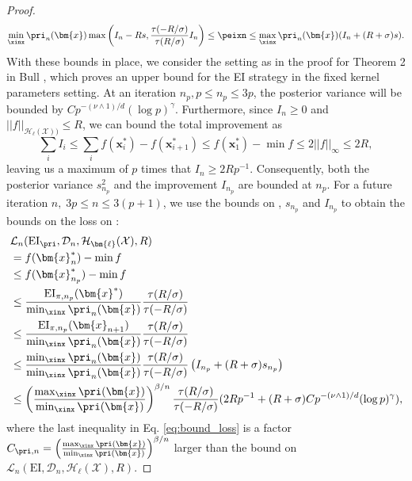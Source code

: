 \begin{proof}
\begin{equation}
    {\min_{\xinx}\pri_n(\bm{x})}\max\left(I_n-Rs, \frac{\tau(-R/\sigma)}{\tau(R/\sigma)}I_n\right) \leq \peixn \leq {\max_{\xinx}\pri_n(\bm{x})} (I_n + (R + \sigma)s). 
\end{equation}
With these bounds in place, we consider the setting as in the proof for Theorem 2 in Bull \cite{JMLR:v12:bull11a}, which proves an upper bound for the EI strategy in the fixed kernel parameters setting. 
At an iteration $n_p, p \leq n_p \leq 3p$, the posterior variance will be bounded by $Cp^{-(\nu \land 1)/d}(\log p)^\gamma$. Furthermore, since $I_n \geq 0$ and $||f||_{\mathcal{H}_\ell(\mathcal{X}))} \leq R$, we can bound the total improvement as
\begin{equation}
    \sum_i I_i \leq \sum_i f(\bm{x}^*_{i}) - f(\bm{x}^*_{i+1}) \leq f(\bm{x}^*_1) - \min f \leq 2||f||_\infty \leq 2R,
\end{equation}
leaving us a maximum of $p$ times that $I_n \geq 2Rp^{-1}$. Consequently, both the posterior variance $s^2_{n_p}$ and the improvement $I_{n_p}$ are bounded at $n_p$. For a future iteration $n,\; 3p \leq n \leq 3(p+1)$, we use the  bounds on \pei, $s_{n_p}$ and $I_{n_p}$ to obtain the bounds on the loss on \pei{}:
\begin{equation} \label{eq:bound_loss}
\begin{split}
    &\mathcal{L}_{n}(\text{EI}_\pri, \mathcal{D}_n, \mathcal{H}_{\bm{\ell}}(\mathcal{X}), R) \\
    &= f(\bm{x}_n^*) - \min f \\
    &\leq  f(\bm{x}_{n_p}^*) - \min f \\
    &\leq\frac{\text{EI}_{\pi,n_p}(\bm{x}^*)}{\min_{\xinx}\pri_n(\bm{x})}  \frac{\tau (R/\sigma)}{\tau (-R/\sigma)} \\
    &\leq
    \frac{\text{EI}_{\pi,n_p}(\bm{x}_{n+1})}{\min_{\xinx}\pri_n(\bm{x})}  \frac{\tau (R/\sigma)}{\tau (-R/\sigma)} \\
    &\leq\frac{\min_{\xinx}\pri_n(\bm{x})}{\min_{\xinx}\pri_n(\bm{x})}  \frac{\tau (R/\sigma)}{\tau (-R/\sigma)}
    \left(I_{n_p} + (R+\sigma)s_{n_p}\right)\\
    &\leq\left(\frac{\max_{\xinx}\pri(\bm{x})}{\min_{\xinx}\pri(\bm{x})}\right)^{\beta/n}  \frac{\tau (R/\sigma)}{\tau (-R/\sigma)} (2Rp^{-1} + (R+\sigma)Cp^{-(\nu \land 1)/d}(\log p)^\gamma),
\end{split}
\end{equation}
where the last inequality in Eq. \ref{eq:bound_loss} is a factor $C_{\pri, n} = \left(\frac{\max_{\xinx}\pri(\bm{x})}{\min_{\xinx}\pri(\bm{x})}\right)^{\beta/n}$ larger than the bound on $\mathcal{L}_n(\text{EI}, \mathcal{D}_n, \mathcal{H}_{\bm{\ell}}(\mathcal{X}), R)$.
\end{proof} 
